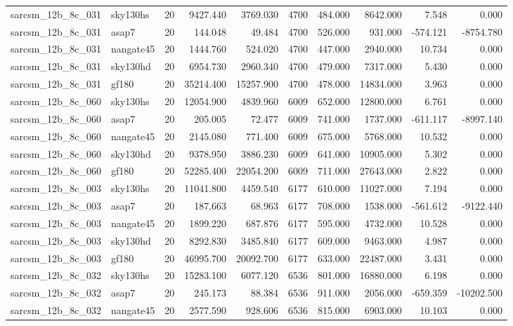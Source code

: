 \begin{longtable}{llrrrrrrrr}
sarcsm\_12b\_8c\_031 & sky130hs & 20 & 9427.440 & 3769.030 & 4700 & 484.000 & 8642.000 & 7.548 & 0.000 \\
sarcsm\_12b\_8c\_031 & asap7 & 20 & 144.048 & 49.484 & 4700 & 526.000 & 931.000 & -574.121 & -8754.780 \\
sarcsm\_12b\_8c\_031 & nangate45 & 20 & 1444.760 & 524.020 & 4700 & 447.000 & 2940.000 & 10.734 & 0.000 \\
sarcsm\_12b\_8c\_031 & sky130hd & 20 & 6954.730 & 2960.340 & 4700 & 479.000 & 7317.000 & 5.430 & 0.000 \\
sarcsm\_12b\_8c\_031 & gf180 & 20 & 35214.400 & 15257.900 & 4700 & 478.000 & 14834.000 & 3.963 & 0.000 \\
sarcsm\_12b\_8c\_060 & sky130hs & 20 & 12054.900 & 4839.960 & 6009 & 652.000 & 12800.000 & 6.761 & 0.000 \\
sarcsm\_12b\_8c\_060 & asap7 & 20 & 205.005 & 72.477 & 6009 & 741.000 & 1737.000 & -611.117 & -8997.140 \\
sarcsm\_12b\_8c\_060 & nangate45 & 20 & 2145.080 & 771.400 & 6009 & 675.000 & 5768.000 & 10.532 & 0.000 \\
sarcsm\_12b\_8c\_060 & sky130hd & 20 & 9378.950 & 3886.230 & 6009 & 641.000 & 10905.000 & 5.302 & 0.000 \\
sarcsm\_12b\_8c\_060 & gf180 & 20 & 52285.400 & 22054.200 & 6009 & 711.000 & 27643.000 & 2.822 & 0.000 \\
sarcsm\_12b\_8c\_003 & sky130hs & 20 & 11041.800 & 4459.540 & 6177 & 610.000 & 11027.000 & 7.194 & 0.000 \\
sarcsm\_12b\_8c\_003 & asap7 & 20 & 187.663 & 68.963 & 6177 & 708.000 & 1538.000 & -561.612 & -9122.440 \\
sarcsm\_12b\_8c\_003 & nangate45 & 20 & 1899.220 & 687.876 & 6177 & 595.000 & 4732.000 & 10.528 & 0.000 \\
sarcsm\_12b\_8c\_003 & sky130hd & 20 & 8292.830 & 3485.840 & 6177 & 609.000 & 9463.000 & 4.987 & 0.000 \\
sarcsm\_12b\_8c\_003 & gf180 & 20 & 46995.700 & 20092.700 & 6177 & 633.000 & 22487.000 & 3.431 & 0.000 \\
sarcsm\_12b\_8c\_032 & sky130hs & 20 & 15283.100 & 6077.120 & 6536 & 801.000 & 16880.000 & 6.198 & 0.000 \\
sarcsm\_12b\_8c\_032 & asap7 & 20 & 245.173 & 88.384 & 6536 & 911.000 & 2056.000 & -659.359 & -10202.500 \\
sarcsm\_12b\_8c\_032 & nangate45 & 20 & 2577.590 & 928.606 & 6536 & 815.000 & 6903.000 & 10.103 & 0.000 \\

\end{longtable}
